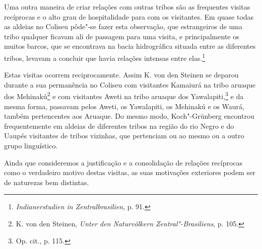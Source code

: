 Uma outra maneira de criar relações com outras tribos são as frequentes
visitas recíprocas e o alto grau de hospitalidade para com os
visitantes. Em quase todas as aldeias no Coliseu pôde"-se fazer esta
observação, que estrangeiros de uma tribo qualquer ficavam ali de
passagem para uma visita, e principalmente os muitos barcos, que se
encontrava na bacia hidrográfica situada entre as diferentes tribos,
levavam a concluir que havia relações intensas entre elas.\footnote{\emph{Indianerstudien
  in Zentralbrasilien}, p. 91.}

Estas visitas ocorrem reciprocamente. Assim K. von den Steinen se
deparou durante a sua permanência no Coliseu com visitantes Kamaiurá na
tribo aruaque dos Mehinakú\footnote{K. von den Steinen, \emph{Unter den
  Naturvölkern Zentral"-Brasiliens}, p. 105.} e com visitantes Aweti na
tribo aruaque dos Yawalapiti,\footnote{Op. cit., p. 115.} e da mesma
forma, passavam pelos Aweti, os Yawalapiti, os Mehinakú e os Waurá,
também pertencentes aos Aruaque. Do mesmo modo, Koch"-Grünberg encontrou
frequentemente em aldeias de diferentes tribos na região do rio Negro e
do Uaupés visitantes de tribos vizinhas, que pertenciam ou ao mesmo ou a
outro grupo linguístico.

Ainda que consideremos a justificação e a consolidação de relações
recíprocas como o verdadeiro motivo destas visitas, as suas motivações
exteriores podem ser de naturezas bem distintas.


